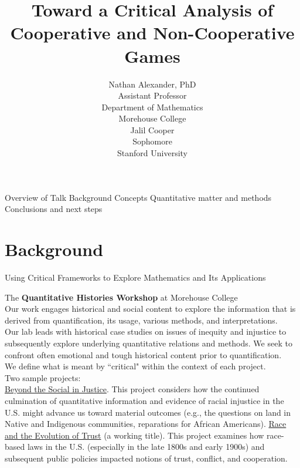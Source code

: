 \documentclass[10pt]{beamer} %
\title{\Large \color{Maroon} Toward a Critical Analysis of \\ Cooperative and Non-Cooperative Games}
\subtitle{\scriptsize \color{Maroon} \sc }
\author{\tiny Nathan Alexander, PhD \\ Assistant Professor \\ Department of Mathematics \\ Morehouse College \\ \vspace{.4cm} Jalil Cooper \\ Sophomore \\ Stanford University}
\institute{\tiny \sc 2023 Joint Math Meetings \\ NAM-SIAM Special Session on Quantitative Justice 
}
\date{}
\theoremstyle{plain} %
\theoremstyle{definition} %
\begin{document}
\begin{frame}
\titlepage
\end{frame}


\begin{frame}{\color{Maroon} Overview of Talk}
Background 
\vfill
Concepts
\vfill
Quantitative matter and methods
\vfill
Conclusions and next steps \\
\vfill
\end{frame}

\section{\color{Maroon} Background}




\begin{frame}{\color{Maroon} \small Using Critical Frameworks to Explore Mathematics and Its Applications}

{\color{Maroon} The \textbf{Quantitative Histories Workshop} at Morehouse College} \\ 
\noindent \small Our work engages historical and social content to explore the information that is derived from quantification, its usage, various methods, and interpretations. \\
\vfill
Our lab leads with historical case studies on issues of inequity and injustice to subsequently explore underlying quantitative relations and methods. We seek to confront often emotional and tough historical content prior to quantification. \\
\vfill
We define what is meant by ``critical" within the context of each project. \\
\vfill
\noindent Two sample projects: \\
\vfill
\underline{Beyond the Social in Justice}. This project considers how the continued culmination of quantitative information and evidence of racial injustice in the U.S. might advance us toward material outcomes (e.g., the questions on land in Native and Indigenous communities, reparations for African Americans). 
\vfill
 \underline{Race and the Evolution of Trust} (a working title). This project examines how race-based laws in the U.S. (especially in the late 1800s and early 1900s) and subsequent public policies impacted notions of trust, conflict, and cooperation.
 \vfill
\end{frame}
\end{document}
